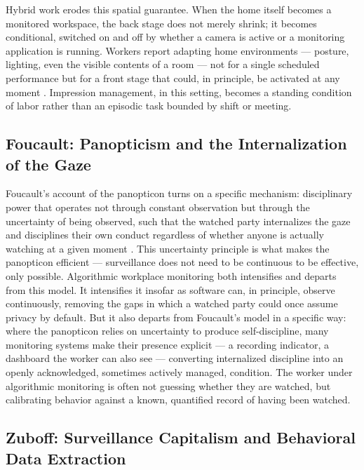 \documentclass[10pt]{article}
\begin{document}
Hybrid work erodes this spatial guarantee. When the home itself becomes a monitored workspace, the back stage does not merely shrink; it becomes conditional, switched on and off by whether a camera is active or a monitoring application is running. Workers report adapting home environments --- posture, lighting, even the visible contents of a room --- not for a single scheduled performance but for a front stage that could, in principle, be activated at any moment \cite{diard2025}. Impression management, in this setting, becomes a standing condition of labor rather than an episodic task bounded by shift or meeting.

\subsection{Foucault: Panopticism and the Internalization of the Gaze}

Foucault's account of the panopticon turns on a specific mechanism: disciplinary power that operates not through constant observation but through the uncertainty of being observed, such that the watched party internalizes the gaze and disciplines their own conduct regardless of whether anyone is actually watching at a given moment \cite{foucault}. This uncertainty principle is what makes the panopticon efficient --- surveillance does not need to be continuous to be effective, only possible. Algorithmic workplace monitoring both intensifies and departs from this model. It intensifies it insofar as software can, in principle, observe continuously, removing the gaps in which a watched party could once assume privacy by default. But it also departs from Foucault's model in a specific way: where the panopticon relies on uncertainty to produce self-discipline, many monitoring systems make their presence explicit --- a recording indicator, a dashboard the worker can also see --- converting internalized discipline into an openly acknowledged, sometimes actively managed, condition. The worker under algorithmic monitoring is often not guessing whether they are watched, but calibrating behavior against a known, quantified record of having been watched.

\subsection{Zuboff: Surveillance Capitalism and Behavioral Data Extraction}
\end{document}
